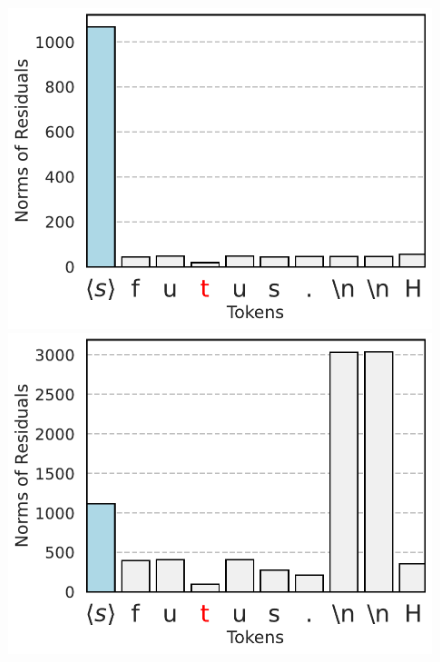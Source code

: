 \begin{figure}[h]
  \centering
  \begin{minipage}{0.3\textwidth}
      \centering
      \vspace{-.2em}
      \includegraphics[width=\linewidth]{Figures/BBM_appendix/norms_layer_0.pdf}
  \end{minipage}
  \begin{minipage}{0.3\textwidth}
      \centering
      \vspace{-.2em}
      \includegraphics[width=\linewidth]{Figures/BBM_appendix/norms_layer_1.pdf}
  \end{minipage}

\end{figure}
